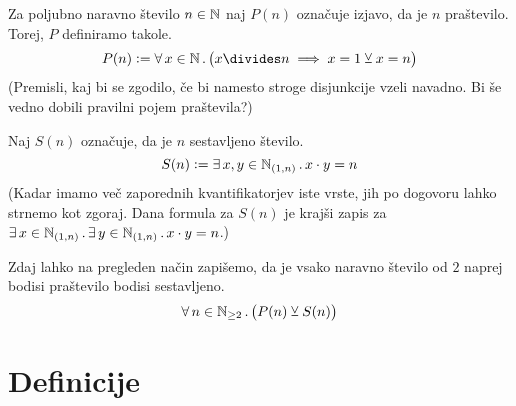 		\begin{zgled}
			Za poljubno naravno število $n \in \mathbb{N}$ naj $P(n)$ označuje izjavo, da je $n$ praštevilo. Torej, $P$ definiramo takole.
			\[P(n) \dfeq \all[1]{x}[\NN]{x \divides n \implies x = 1 \xor x = n}\]
			(Premisli, kaj bi se zgodilo, če bi namesto stroge disjunkcije vzeli navadno. Bi še vedno dobili pravilni pojem praštevila?)
			
			Naj $S(n)$ označuje, da je $n$ sestavljeno število.
			\[S(n) \dfeq \xsome{x, y}[\intoo[\NN]{1}{n}]{x \cdot y = n}\]
			(Kadar imamo več zaporednih kvantifikatorjev iste vrste, jih po dogovoru lahko strnemo kot zgoraj. Dana formula za $S(n)$ je krajši zapis za $\xsome{x}[\intoo[\NN]{1}{n}]{\xsome{y}[\intoo[\NN]{1}{n}]{x \cdot y = n}}$.)
			
			Zdaj lahko na pregleden način zapišemo, da je vsako naravno število od $2$ naprej bodisi praštevilo bodisi sestavljeno.
			\[\all[1]{n}[\NN_{\geq 2}]{P(n) \xor S(n)}\]
		\end{zgled}
	
	
	\section{Definicije}
	
		
